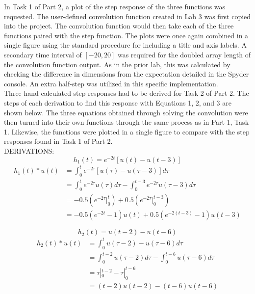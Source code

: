 \documentclass[12pt]{report}
\begin{document}
In Task 1 of Part 2, a plot of the step response of the three functions was requested. The user-defined convolution function created in Lab 3 was first copied into the project. The convolution function would then take each of the three functions  paired with the step function. The plots were once again combined in a single figure using the standard procedure for including a title and axis labels. A secondary time interval of $ [-20,20] $ was required for the doubled array length of the convolution function output. As in the prior lab, this was calculated by checking the difference in dimensions from the expectation detailed in the Spyder console. An extra half-step was utilized in this specific implementation. \\

Three hand-calculated step responses had to be derived for Task 2 of Part 2. The steps of each derivation to find this response with Equations 1, 2, and 3 are shown below. The three equations obtained through solving the convolution were then turned into their own functions through the same process as in Part 1, Task 1. Likewise, the functions were plotted in a single figure to compare with the step responses found in Task 1 of Part 2. \\

DERIVATIONS:  
\begin{equation*}
	h_1(t) = e^{-2t}[u(t) - u(t - 3)]
\end{equation*}
\begin{align*}
	h_1(t) * u(t) &= \int_{0}^{t} e^{-2\tau}[u(\tau) - u(\tau - 3)] d\tau \\
	&= \int_{0}^{t} e^{-2\tau}u(\tau) d\tau - \int_{0}^{t - 3} e^{-2\tau}u(\tau - 3) d\tau \\
	&= -0.5 (e^{-2\tau} |_{0}^{t} ) + 0.5 (e^{-2\tau} |_{0}^{t - 3}) \\
	&= -0.5(e^{-2t} - 1)u(t) + 0.5(e^{-2(t - 3)} - 1)u(t - 3)
\end{align*}

\begin{equation*}
	h_2(t)= u(t - 2) - u(t - 6)
\end{equation*}
\begin{align*}
	h_2(t) * u(t) &= \int_{0}^{t}u(\tau - 2) - u(\tau - 6) d\tau \\
	&= \int_{0}^{t - 2}u(\tau - 2) d\tau - \int_{0}^{t - 6}u(\tau - 6) d\tau \\
	&= \tau |_{0}^{t - 2} - \tau |_{0}^{t - 6} \\
	&= (t - 2)u(t - 2) - (t - 6)u(t - 6)
\end{align*}
\end{document}
